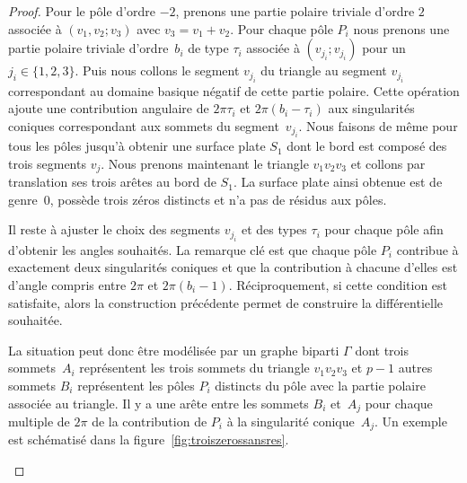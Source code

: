 \begin{proof}
Pour le pôle d'ordre $-2$, prenons une partie polaire triviale d'ordre $2$ associée à $(v_{1},v_{2};v_{3})$ avec $v_{3}=v_{1}+v_{2}$. Pour chaque pôle $P_{i}$ nous prenons une partie polaire triviale d'ordre~$b_{i}$ de type $\tau_{i}$ associée à $(v_{j_{i}};v_{j_{i}})$ pour un $j_{i}\in\lbrace 1,2,3 \rbrace$. Puis nous collons le segment $v_{j_{i}}$ du triangle au segment $v_{j_{i}}$ correspondant au domaine basique négatif de cette partie polaire. Cette opération ajoute une contribution angulaire de $2\pi\tau_{i}$ et $2\pi(b_{i}-\tau_{i})$ aux singularités coniques correspondant aux sommets du segment~$v_{j_{i}}$. Nous faisons de même pour tous les pôles jusqu'à obtenir une surface plate $S_{1}$ dont le bord est composé des trois segments $v_{j}$. Nous prenons maintenant le triangle $v_{1}v_{2}v_{3}$ et collons par translation ses trois arêtes au bord de $S_{1}$.
La surface plate ainsi obtenue est de genre~$0$, possède trois zéros distincts et n'a pas de résidus aux pôles.
\par
Il reste à ajuster le choix des segments $v_{j_{i}}$ et des types $\tau_{i}$ pour chaque pôle afin d'obtenir les angles souhaités. La remarque clé est que chaque pôle $P_{i}$ contribue à exactement deux singularités coniques et que la contribution à chacune d'elles est d'angle compris entre $2\pi$ et $2\pi(b_{i}-1)$. Réciproquement, si cette condition est satisfaite, alors la construction précédente permet de construire la différentielle souhaitée.
\par
La situation peut donc être modélisée par un graphe biparti $\Gamma$ dont trois sommets~$A_{i}$ représentent les trois sommets du triangle $v_{1}v_{2}v_{3}$ et $p-1$ autres sommets $B_{i}$ représentent les pôles $P_{i}$ distincts du pôle avec la partie polaire associée au triangle. Il y a une arête entre les sommets $B_{i}$ et~$A_{j}$ pour chaque multiple de $2\pi$ de la contribution de $P_{i}$ à la singularité conique~$A_{j}$. Un exemple est schématisé dans la figure~\ref{fig:troiszerossansres}.
\begin{figure}[htb]
\center
{}
\end{figure}
\end{proof}
